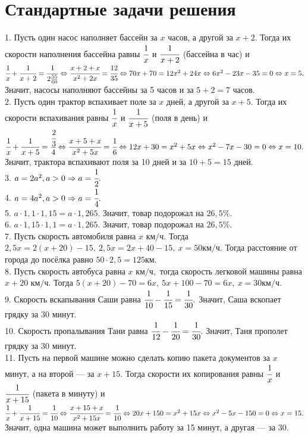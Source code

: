 \section{Стандартные задачи решения}
1. Пусть один насос наполняет бассейн за $x$ часов, а другой за $x+2.$ Тогда их скорости наполнения бассейна равны $\cfrac{1}{x}$ и $\cfrac{1}{x+2}$ (бассейна в час) и $\cfrac{1}{x}+\cfrac{1}{x+2}=\cfrac{1}{2\frac{55}{60}}\Leftrightarrow \cfrac{x+2+x}{x^2+2x}=\cfrac{12}{35}\Leftrightarrow
70x+70=12x^2+24x\Leftrightarrow6x^2-23x-35=0\Leftrightarrow x=5.$ Значит, насосы наполняют бассейны за 5 часов и за $5+2=7$ часов.\\
2. Пусть один трактор вспахивает поле за $x$ дней, а другой за $x+5.$ Тогда их скорости вспахивания равны $\cfrac{1}{x}$ и $\cfrac{1}{x+5}$ (поля в день) и $\cfrac{1}{x}+\cfrac{1}{x+5}=\cfrac{\cfrac{2}{3}}{4}\Leftrightarrow \cfrac{x+5+x}{x^2+5x}=\cfrac{1}{6}\Leftrightarrow
12x+30=x^2+5x\Leftrightarrow x^2-7x-30=0\Leftrightarrow x=10.$ Значит, трактора вспахивают поля за 10 дней и за $10+5=15$ дней.\\
3. $a=2a^2, a>0\Rightarrow a=\cfrac{1}{2}.$\\
4. $a=4a^2, a>0\Rightarrow a=\cfrac{1}{4}.$\\
5. $a\cdot1,1\cdot1,15=a\cdot1,265.$ Значит, товар подорожал на $26,5\%.$\\
6. $a\cdot1,15\cdot1,1=a\cdot1,265.$ Значит, товар подорожал на $26,5\%.$\\
7. Пусть скорость автомобиля равна $x\text{ км/ч}.$ Тогда $2,5x=2(x+20)-15,\ 2,5x=2x+40-15,\ x=50\text{км/ч}.$ Тогда расстояние от города до посёлка равно $50\cdot2,5=125$км.\\
8. Пусть скорость автобуса равна $x\text{ км/ч},$ тогда скорость легковой машины равна $x+20\text{ км/ч}.$ Тогда $5(x+20)-70=6x,\ 5x+100-70=6x,\ x=30\text{км/ч}.$\\
9. Скорость вскапывания Саши равна $\cfrac{1}{10}-\cfrac{1}{15}=\cfrac{1}{30}.$ Значит, Саша вскопает грядку за 30 минут.\\
10. Скорость пропалывания Тани равна $\cfrac{1}{12}-\cfrac{1}{20}=\cfrac{1}{30}.$ Значит, Таня прополет грядку за 30 минут.\\
11. Пусть на первой машине можно сделать копию пакета документов за $x$ минут, а на второй --- за $x+15.$ Тогда скорости их копирования равны $\cfrac{1}{x}$ и
$\cfrac{1}{x+15}$ (пакета в минуту) и $\cfrac{1}{x}+\cfrac{1}{x+15}=\cfrac{1}{10}\Leftrightarrow\cfrac{x+15+x}{x^2+15x}=\cfrac{1}{10}\Leftrightarrow
20x+150=x^2+15x\Leftrightarrow x^2-5x-150=0\Leftrightarrow x=15.$ Значит, одна машина может выполнить работу за 15 минут, а другая --- за 30.\\
